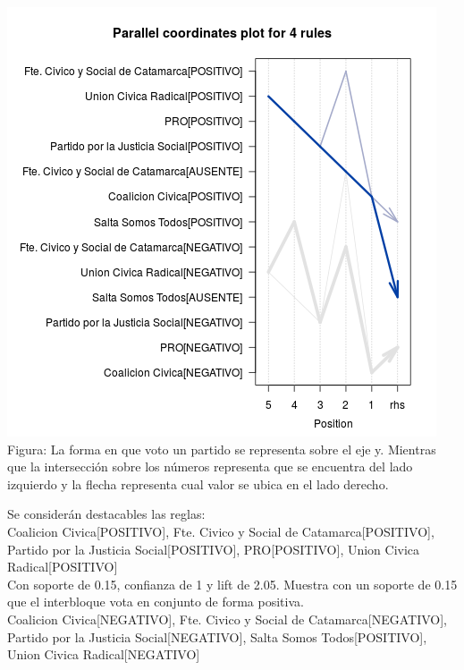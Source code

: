 \documentclass{endm}
\begin{document}
\begin{center}
\includegraphics[scale=0.4]{graficos/paracoordInterbloquesCambiemos.png} \\
\scriptsize{Figura: La forma en que voto un partido se representa sobre el eje y. Mientras que la intersección sobre  los números representa que se encuentra del lado izquierdo y la flecha representa cual valor se ubica en el lado derecho.}
\end{center}

Se considerán destacables las reglas: \\

{Coalicion Civica[POSITIVO],
 Fte. Civico y Social de Catamarca[POSITIVO],
 Partido por la Justicia Social[POSITIVO],   
 PRO[POSITIVO],        
 Union Civica Radical[POSITIVO]}  \\

Con soporte de 0.15, confianza de 1 y lift de 2.05. Muestra  con un soporte de 0.15 que el interbloque vota en conjunto de forma positiva. \\

{Coalicion Civica[NEGATIVO],         
Fte. Civico y Social de Catamarca[NEGATIVO],
Partido por la Justicia Social[NEGATIVO],
Salta Somos Todos[POSITIVO],
Union Civica Radical[NEGATIVO]}   \\
\end{document}
